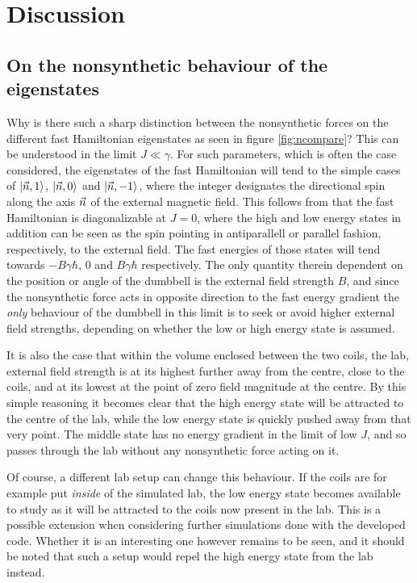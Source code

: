 \documentclass[main.tex]{subfiles}
\begin{document}
\section{Discussion}
\subsection{On the nonsynthetic behaviour of the eigenstates}\label{sec:nonsynbeh}
Why is there such a sharp distinction between the nonsynthetic forces on the different fast
Hamiltonian eigenstates as seen in figure \ref{fig:ncompare}? This can be understood
in the limit \(J \ll \gamma\). For such parameters, which is often the case considered, the
eigenstates of the fast Hamiltonian will tend to the simple cases of \(\ket{\vec{n}, 1}\),
\(\ket{\vec{n}, 0}\) and \(\ket{\vec{n}, -1}\), where the integer designates the directional
spin along the axis \(\vec{n}\) of the external magnetic field. This follows from that the fast
Hamiltonian is diagonalizable at \(J = 0\), where the high and low energy states
in addition can be seen as the spin pointing in antiparallell or
parallel fashion, respectively, to the external field. The fast energies of those
states will tend towards \(-B\gamma\hbar{}\), \(0\) and \(B\gamma \hbar{}\) respectively.
The only quantity therein dependent on the position or angle of the dumbbell is the
external field strength \(B\), and since the nonsynthetic force acts in opposite direction
to the fast energy gradient the \textit{only} behaviour of the dumbbell in this limit is to
seek or avoid higher external field strengths, depending on whether the low or high energy
state is assumed. 

It is also the case that within the volume enclosed between the two coils, the lab,
external field strength is at its highest further away from the centre, close to the coils,
and at its lowest at the point of zero field magnitude at the centre. By this simple
reasoning it becomes clear that the high energy state will be attracted to the centre of
the lab, while the low energy state is quickly pushed away from that very point. The middle
state has no energy gradient in the limit of low \(J\), and so passes through the lab
without any nonsynthetic force acting on it.

Of course, a different lab setup can change this behaviour. If the coils are for example
put \textit{inside} of the simulated lab, the low energy state becomes available to study
as it will be attracted to the coils now present in the lab. This is a possible extension
when considering further simulations done with the developed code. Whether it is an
interesting one however remains to be seen, and it should be noted that such a setup would repel
the high energy state from the lab instead.
\end{document}
